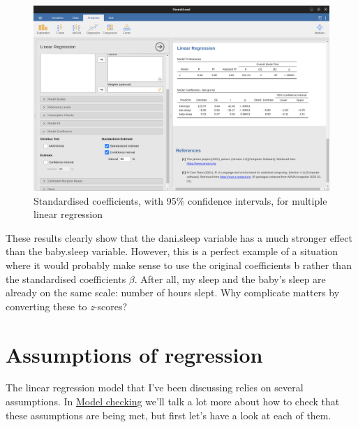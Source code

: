 \documentclass[
  a4paper,
]{book}
\begin{document}
\begin{figure}[h!]

\includegraphics[width=1\textwidth,height=\textheight]{images/fig12-16.png} \hfill{}

\caption{\label{fig-fig12-16}Standardised coefficients, with 95\%
confidence intervals, for multiple linear regression}

\end{figure}

These results clearly show that the dani.sleep variable has a much
stronger effect than the baby.sleep variable. However, this is a perfect
example of a situation where it would probably make sense to use the
original coefficients b rather than the standardised coefficients
\(\beta\). After all, my sleep and the baby's sleep are already on the
same scale: number of hours slept. Why complicate matters by converting
these to \emph{z}-scores?

\hypertarget{assumptions-of-regression}{%
\section{Assumptions of regression}\label{assumptions-of-regression}}

The linear regression model that I've been discussing relies on several
assumptions. In \protect\hyperlink{sec-Model-checking}{Model checking}
we'll talk a lot more about how to check that these assumptions are
being met, but first let's have a look at each of them.
\end{document}
